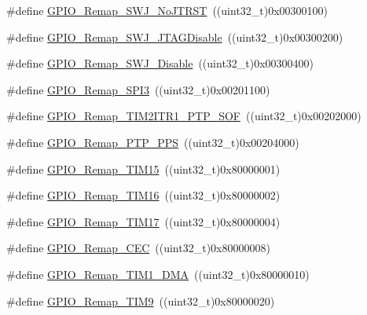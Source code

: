\begin{DoxyCompactItemize}
\item 
\#define \hyperlink{group___g_p_i_o___remap__define_ga81009ef35f7f039365291cf4f6fc0c5b}{G\+P\+I\+O\+\_\+\+Remap\+\_\+\+S\+W\+J\+\_\+\+No\+J\+T\+R\+ST}~((uint32\+\_\+t)0x00300100)
\item 
\#define \hyperlink{group___g_p_i_o___remap__define_ga25fb8c789334694861444e48f486879d}{G\+P\+I\+O\+\_\+\+Remap\+\_\+\+S\+W\+J\+\_\+\+J\+T\+A\+G\+Disable}~((uint32\+\_\+t)0x00300200)
\item 
\#define \hyperlink{group___g_p_i_o___remap__define_gaf4832412d0ba344bb9147142cfcda828}{G\+P\+I\+O\+\_\+\+Remap\+\_\+\+S\+W\+J\+\_\+\+Disable}~((uint32\+\_\+t)0x00300400)
\item 
\#define \hyperlink{group___g_p_i_o___remap__define_gac7fd74244a9d53ca02cc86bb6543a689}{G\+P\+I\+O\+\_\+\+Remap\+\_\+\+S\+P\+I3}~((uint32\+\_\+t)0x00201100)
\item 
\#define \hyperlink{group___g_p_i_o___remap__define_ga0dc4bec540b9372479e63295fe68ac17}{G\+P\+I\+O\+\_\+\+Remap\+\_\+\+T\+I\+M2\+I\+T\+R1\+\_\+\+P\+T\+P\+\_\+\+S\+OF}~((uint32\+\_\+t)0x00202000)
\item 
\#define \hyperlink{group___g_p_i_o___remap__define_ga3e9d7808d1e50393afde08e4a45d18aa}{G\+P\+I\+O\+\_\+\+Remap\+\_\+\+P\+T\+P\+\_\+\+P\+PS}~((uint32\+\_\+t)0x00204000)
\item 
\#define \hyperlink{group___g_p_i_o___remap__define_gaead5c447875e8b384945424845452b82}{G\+P\+I\+O\+\_\+\+Remap\+\_\+\+T\+I\+M15}~((uint32\+\_\+t)0x80000001)
\item 
\#define \hyperlink{group___g_p_i_o___remap__define_gac9d612f9f9f9f66faecbdbbc29d2ac61}{G\+P\+I\+O\+\_\+\+Remap\+\_\+\+T\+I\+M16}~((uint32\+\_\+t)0x80000002)
\item 
\#define \hyperlink{group___g_p_i_o___remap__define_ga9fe98e01f8837d6a1ac4b4833f0fc45e}{G\+P\+I\+O\+\_\+\+Remap\+\_\+\+T\+I\+M17}~((uint32\+\_\+t)0x80000004)
\item 
\#define \hyperlink{group___g_p_i_o___remap__define_gac5961690908d4a0737e82b5a7d271b9b}{G\+P\+I\+O\+\_\+\+Remap\+\_\+\+C\+EC}~((uint32\+\_\+t)0x80000008)
\item 
\#define \hyperlink{group___g_p_i_o___remap__define_ga255adf908d7d530267707fee39ba2026}{G\+P\+I\+O\+\_\+\+Remap\+\_\+\+T\+I\+M1\+\_\+\+D\+MA}~((uint32\+\_\+t)0x80000010)
\item 
\#define \hyperlink{group___g_p_i_o___remap__define_gadfed4d88bc9a4093d16ce64a85b6051a}{G\+P\+I\+O\+\_\+\+Remap\+\_\+\+T\+I\+M9}~((uint32\+\_\+t)0x80000020)
\item 

\end{DoxyCompactItemize}
